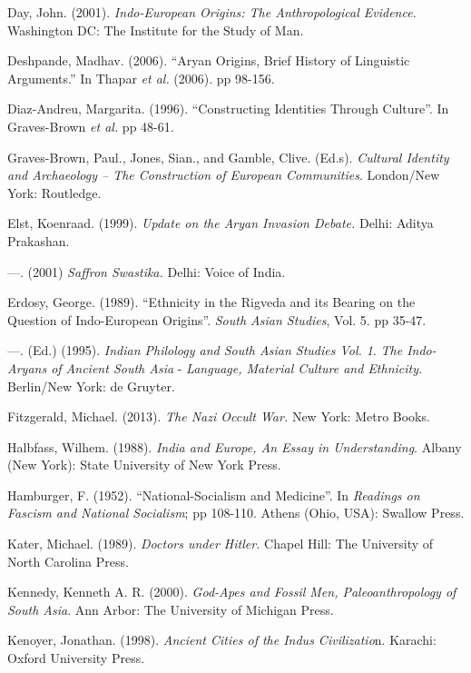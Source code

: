 \begin{thebibliography}{99}
  Day, John. (2001). \textit{Indo-European Origins: The Anthropological Evidence.} Washington DC: The Institute for the Study of Man.

  Deshpande, Madhav. (2006). “Aryan Origins, Brief History of Linguistic Arguments.” In Thapar \textit{et al.} (2006). pp 98-156.

  Diaz-Andreu, Margarita. (1996). “Constructing Identities Through Culture”. In Graves-Brown \textit{et al.} pp 48-61.

  Graves-Brown, Paul., Jones, Sian., and Gamble, Clive. (Ed.s). \textit{Cultural Identity and Archaeology – The Construction of European Communities}. London/New York: Routledge.

  Elst, Koenraad. (1999). \textit{Update on the Aryan Invasion Debate. }Delhi: Aditya Prakashan.

  —. (2001) \textit{Saffron Swastika. }Delhi: Voice of India.

  Erdosy, George. (1989). “Ethnicity in the Rigveda and its Bearing on the Question of Indo-European Origins”. \textit{South Asian Studies}, Vol. 5. pp 35-47.

  —. (Ed.) (1995). \textit{Indian Philology and South Asian Studies Vol. 1}. \textit{The Indo-Aryans of Ancient South Asia} - \textit{Language, Material Culture and Ethnicity. } Berlin/New York: de Gruyter.

  Fitzgerald, Michael. (2013). \textit{The Nazi Occult War. }New York: Metro Books.

  Halbfass, Wilhem. (1988). \textit{India and Europe, An Essay in Understanding}. Albany (New York): State University of New York Press.

  Hamburger, F. (1952). “National-Socialism and Medicine”. In \textit{Readings on Fascism and National Socialism}; pp 108-110. Athens (Ohio, USA): Swallow Press.

  Kater, Michael. (1989). \textit{Doctors under Hitler.} Chapel Hill: The University of North Carolina Press.

  Kennedy, Kenneth A. R. (2000). \textit{God-Apes and Fossil Men, Paleoanthropology of South Asia}. Ann Arbor: The University of Michigan Press.

  Kenoyer, Jonathan. (1998). \textit{Ancient Cities of the Indus Civilizatio}n. Karachi: Oxford University Press.


\end{thebibliography}
